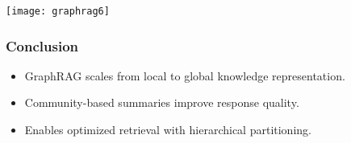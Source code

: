 \begin{frame}[fragile]\frametitle{}

	\begin{center}
	\texttt{[image: graphrag6]}
	\end{center}
	
\end{frame}






	



	


	

\begin{frame}[fragile]\frametitle{Conclusion}
    \begin{itemize}
        \item GraphRAG scales from local to global knowledge representation.
        \item Community-based summaries improve response quality.
        \item Enables optimized retrieval with hierarchical partitioning.
    \end{itemize}
\end{frame}


